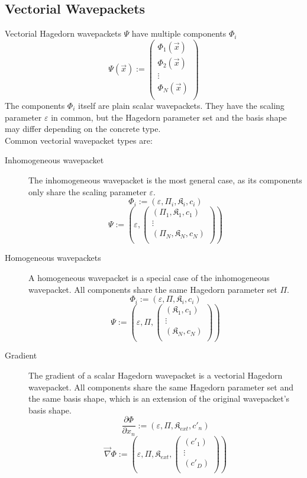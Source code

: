 \documentclass{article}
\begin{document}
\subsection{Vectorial Wavepackets}
Vectorial Hagedorn wavepackets \(\Psi\) have multiple components \(\Phi_i\)
\[
  \Psi(\vec{x}) :=
  \begin{pmatrix}
    \Phi_1(\vec{x}) \\
    \Phi_2(\vec{x}) \\
    \vdots \\
    \Phi_N(\vec{x}) \\
  \end{pmatrix}
\]
The components \(\Phi_i\) itself are plain scalar wavepackets.
They have the scaling parameter \(\varepsilon\) in common, but
the Hagedorn parameter set and the basis shape may differ depending on
the concrete type. \\
Common vectorial wavepacket types are:
\begin{description}
\item[Inhomogeneous wavepacket]
  The inhomogeneous wavepacket is the most general case, as its components only share
  the scaling parameter \(\varepsilon\).
  \[
    \Phi_i := (\varepsilon, \Pi_i, \mathfrak{K}_i, c_i) \] \[
    \Psi := \left(\varepsilon, 
    \begin{pmatrix}
      (\Pi_1, \mathfrak{K}_1, c_1) \\
      \vdots \\
      (\Pi_N, \mathfrak{K}_N, c_N) \\
    \end{pmatrix}\right)
  \]
\item[Homogeneous wavepackets]
  A homogeneous wavepacket is a special case of the inhomogeneous wavepacket.
  All components share the same Hagedorn parameter set \(\Pi\).
  \[
    \Phi_i := (\varepsilon, \Pi, \mathfrak{K}_i, c_i) \] \[
    \Psi := \left(\varepsilon, \Pi,
    \begin{pmatrix}
      (\mathfrak{K}_1, c_1) \\
      \vdots \\
      (\mathfrak{K}_N, c_N) \\
    \end{pmatrix}\right)
  \]
\item[Gradient]
  The gradient of a scalar Hagedorn wavepacket is a vectorial Hagedorn
  wavepacket. All components share the same Hagedorn parameter set and the
  same basis shape, which is an extension of the original wavepacket's basis shape.
  \[
    \frac{\partial \Phi}{\partial x_n} := (\varepsilon, \Pi, \mathfrak{K}_{ext}, c'_n) \] \[
    \vec{\nabla} \Phi := \left(\varepsilon, \Pi, \mathfrak{K}_{ext},
    \begin{pmatrix}
      (c'_1) \\
      \vdots \\
      (c'_D) \\
    \end{pmatrix}\right)
  \]
\end{description}
\end{document}
